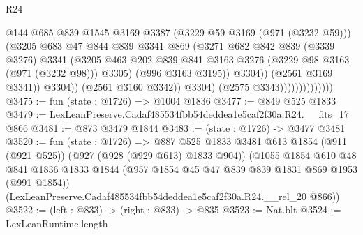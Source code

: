 \begin{lexlean}{R24}
\begin{coremodule}
                                          @144
                                          @685
                                          @839
                                          @1545
                                          @3169
                                          @3387
                                          (@3229 @59 @3169 (@971 (@3232 @59)))
                                          (@3205
                                            @683
                                            @47
                                            @844
                                            @839
                                            @3341
                                            @869
                                            (@3271
                                              @682
                                              @842
                                              @839
                                              (@3339 @3276)
                                              @3341
                                              (@3205
                                                @463
                                                @202
                                                @839
                                                @841
                                                @3163
                                                @3276
                                                (@3229 @98 @3163 (@971 (@3232 @98)))
                                                @3305)
                                              (@996 @3163 @3195))
                                            @3304))
                                        (@2561 @3169 @3341))
                                      @3304))
                                  (@2561 @3160 @3342))
                                @3304)
                              (@2575 @3343))))))))))))))
@3475 := fun (state : @1726) => @1004 @1836
@3477 := @849 @525 @1833
@3479 := LexLeanPreserve.Cadaf485534fbb54deddea1e5caf2f30a.R24.__fits_17 @866
@3481 := @873 @3479 @1844
@3483 := (state : @1726) -> @3477 @3481
@3520 := fun (state : @1726) =>
  @887
    @525
    @1833
    @3481
    @613
    @1854
    (@911 (@921 @525))
    (@927 (@928 (@929 @613) @1833 @904))
    (@1055
      @1854
      @610
      @48
      @841
      @1836
      @1833
      @1844
      (@957 @1854 @45 @47 @839 @839 @1831 @869 @1953 (@991 @1854))
      (LexLeanPreserve.Cadaf485534fbb54deddea1e5caf2f30a.R24.__rel_20 @866))
@3522 := (left : @833) -> (right : @833) -> @835
@3523 := Nat.blt
@3524 := LexLeanRuntime.length

\end{coremodule}
\end{lexlean}
